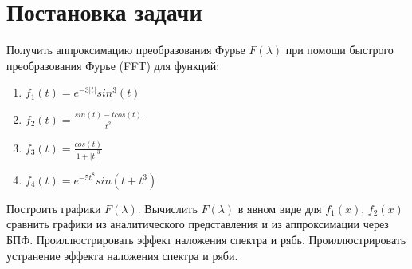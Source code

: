 \section{Постановка задачи} 
Получить аппроксимацию преобразования Фурье $F(\lambda)$ при помощи быстрого преобразования Фурье (FFT) для функций:
\begin{enumerate}
	\item $ f_1(t) = e^{-3|t|}sin^3(t) $
	\item $ f_2(t) = \frac{sin(t)-tcos(t)}{t^2} $
	\item $ f_3(t) = \frac{cos(t)}{1+|t|^3} $
	\item $ f_4(t) = e^{-5t^8}sin(t+t^3)$
\end{enumerate}

Построить графики $F(\lambda)$. Вычислить $F(\lambda)$ в явном виде для $f_1(x)$, $f_2(x)$ сравнить графики из аналитического представления и из аппроксимации через БПФ.
Проиллюстрировать эффект наложения спектра и рябь.
Проиллюстрировать устранение эффекта наложения спектра и ряби.
